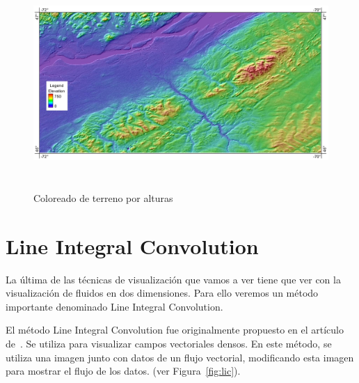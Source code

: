 \begin{figure}[h!]
	\centering	
	\includegraphics[height=8cm]{figures/terraincoloring.jpg}
	\caption{Coloreado de terreno por alturas}
	\label{fig:terrain}
\end{figure}

\section{Line Integral Convolution}
\label{ref:lic}

La última de las técnicas de visualización que vamos a ver tiene que ver con la
visualización de fluidos en dos dimensiones. Para ello veremos un método
importante denominado Line Integral Convolution.

El método Line Integral Convolution fue originalmente propuesto en el artículo
de~\citet{osti_10185520}. Se utiliza para visualizar campos vectoriales densos.
En este método, se utiliza una imagen junto con datos de un flujo vectorial,
modificando esta imagen para mostrar el flujo de los datos. (ver
Figura~\ref{fig:lic}). 

